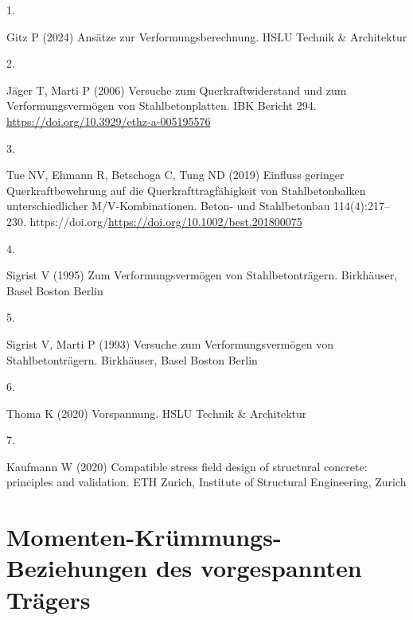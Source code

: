 \documentclass[
  11pt,
  letterpaper,
]{scrreprt}
\newlength{\cslhangindent}
\newlength{\csllabelwidth}
\newenvironment{CSLReferences}[2] %
 {\begin{list}{}{%
  \setlength{\itemindent}{0pt}
  \setlength{\leftmargin}{0pt}
  \setlength{\parsep}{0pt}
  \ifodd #1
   \setlength{\leftmargin}{\cslhangindent}
   \setlength{\itemindent}{-1\cslhangindent}
  \fi
  \setlength{\itemsep}{#2\baselineskip}}}
 {\end{list}}
\newcommand{\CSLLeftMargin}[1]{\parbox[t]{\csllabelwidth}{\strut#1\strut}}
\newcommand{\CSLRightInline}[1]{\parbox[t]{\linewidth - \csllabelwidth}{\strut#1\strut}}
\begin{document}
\label{refs}
\begin{CSLReferences}{0}{1}
\CSLLeftMargin{1. }%
\CSLRightInline{Gitz P (2024) Ansätze zur {Verformungsberechnung}. HSLU
Technik \& Architektur}

\CSLLeftMargin{2. }%
\CSLRightInline{Jäger T, Marti P (2006) Versuche zum
{Querkraftwiderstand} und zum {Verformungsvermögen} von
{Stahlbetonplatten}. IBK Bericht 294.
\url{https://doi.org/10.3929/ethz-a-005195576}}

\CSLLeftMargin{3. }%
\CSLRightInline{Tue NV, Ehmann R, Betschoga C, Tung ND (2019) Einfluss
geringer {Querkraftbewehrung} auf die {Querkrafttragfähigkeit} von
{Stahlbetonbalken} unterschiedlicher {M}/{V}-{Kombinationen}. Beton- und
Stahlbetonbau 114(4):217--230.
https://doi.org/\url{https://doi.org/10.1002/best.201800075}}

\CSLLeftMargin{4. }%
\CSLRightInline{Sigrist V (1995) Zum {Verformungsvermögen} von
{Stahlbetonträgern}. Birkhäuser, Basel Boston Berlin}

\CSLLeftMargin{5. }%
\CSLRightInline{Sigrist V, Marti P (1993) Versuche zum
{Verformungsvermögen} von {Stahlbetonträgern}. Birkhäuser, Basel Boston
Berlin}

\CSLLeftMargin{6. }%
\CSLRightInline{Thoma K (2020) Vorspannung. HSLU Technik \& Architektur}

\CSLLeftMargin{7. }%
\CSLRightInline{Kaufmann W (2020) Compatible stress field design of
structural concrete: principles and validation. ETH Zurich, Institute of
Structural Engineering, Zurich}

\end{CSLReferences}

\cleardoublepage
{}
{}
\appendix

\chapter{Momenten-Krümmungs-Beziehungen des vorgespannten
Trägers}\label{momenten-kruxfcmmungs-beziehungen-des-vorgespannten-truxe4gers}

\end{document}
